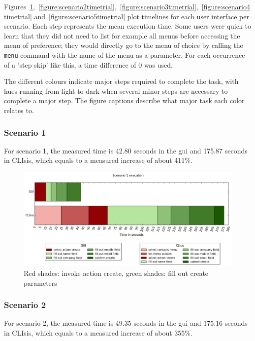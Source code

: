 Figures~\ref{figure:scenario1timetrial},~\ref{figure:scenario2timetrial},~\ref{figure:scenario3timetrial},~\ref{figure:scenario4timetrial} and~\ref{figure:scenario5timetrial} plot timelines for each user interface per scenario. Each step represents the mean execution time. Some users were quick to learn that they did not need to list for example all menus before accessing the menu of preference; they would directly go to the menu of choice by calling the \texttt{menu} command with the name of the menu as a parameter. For each occurrence of a 'step skip' like this, a time difference of 0 was used.

The different colours indicate major steps required to complete the task, with hues running from light to dark when several minor steps are necessary to complete a major step. The figure captions describe what major task each color relates to.

\subsubsection{Scenario 1}
For scenario 1, the measured time is 42.80 seconds in the \acrshort{gui} and 175.87 seconds in CLIsis, which equals to a measured increase of about 411\%.

\begin{figure}[H]
	\center
	\includegraphics[width=\textwidth]{figures/scenario1}
	\caption{Red shades: invoke action create, green shades: fill out create parameters}
	\label{figure:scenario1timetrial}
\end{figure}

\subsubsection{Scenario 2}
For scenario 2, the measured time is 49.35 seconds in the \acrshort{gui} and 175.16 seconds in CLIsis, which equals to a measured increase of about 355\%.

